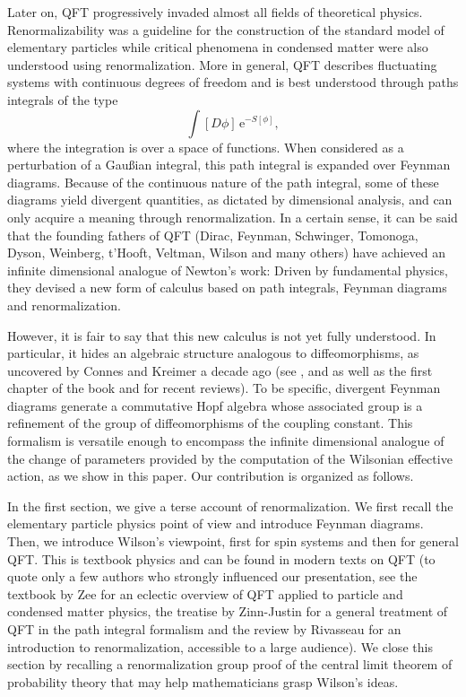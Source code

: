 \documentclass[12pt,here,feynmf]{article}
\begin{document}
Later on, QFT progressively invaded almost all fields of theoretical physics.  Renormalizability was a guideline for the construction of the standard model of elementary particles while critical phenomena in condensed matter were also understood using renormalization. More in general, QFT describes fluctuating systems with continuous degrees of freedom and is best understood through paths integrals of the type
\begin{equation}
\int[D\phi]\,\mathrm{e}^{-S[\phi]},
\end{equation}
where the integration is over a space of functions. When considered as a perturbation of a Gau\ss ian  integral, this path integral is expanded over Feynman diagrams. Because of the continuous nature of the path integral, some of these diagrams yield divergent quantities, as dictated by dimensional analysis, and can only acquire a meaning through renormalization. In a certain sense, it can be said that the founding fathers of QFT (Dirac, Feynman,  Schwinger, Tomonoga, Dyson, Weinberg, t'Hooft, Veltman, Wilson and many others) have achieved an infinite dimensional analogue of Newton's work: Driven by fundamental physics, they devised a new form of calculus based on path integrals, Feynman diagrams and renormalization.


However, it is fair to say that this new calculus is not yet fully understood. In particular, it hides an algebraic structure analogous to diffeomorphisms, as uncovered by Connes and Kreimer a decade ago (see \cite{ck0}, \cite{ck1} and \cite{ck2} as well as the first chapter of the book \cite{connesmarcolli} and \cite{kk} for recent reviews). To be specific, divergent Feynman diagrams generate a commutative Hopf algebra whose associated group is a refinement of the group of diffeomorphisms of the coupling constant. This formalism is versatile enough to encompass the infinite dimensional analogue of the change of parameters provided by the computation of the Wilsonian effective action, as we show in this paper. Our contribution is organized as follows.

In the first section, we give a terse account of renormalization. We first recall the elementary particle physics point of view and introduce Feynman diagrams. Then, we introduce Wilson's viewpoint, first for spin systems and then for general QFT. This is textbook physics and can be found in modern texts on QFT (to quote only a few authors who strongly influenced our presentation, see the textbook \cite{zee}  by Zee for an eclectic overview of QFT applied to particle and condensed matter physics, the treatise by Zinn-Justin \cite{zinn} for a general treatment of QFT in the path integral formalism  and the review by Rivasseau \cite{Rivasseau} for an introduction to renormalization, accessible to a large audience). We close this section by recalling a renormalization group proof of the central limit theorem of probability theory that may help mathematicians grasp Wilson's ideas.
\end{document}
